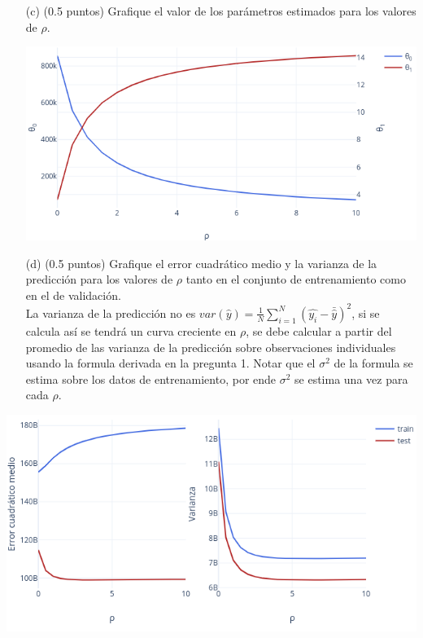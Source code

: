 \documentclass[11pt,letterpaper]{article}
\begin{document}
\begin{itemize}
\begin{itemize}
	\item[(c)] (0.5 puntos) Grafique el valor de los parámetros estimados para los valores de $\rho$.\\
	
    \begin{minipage}{\linewidth}
        \centering
        \includegraphics[width=1\textwidth]{img/params.png}
    \end{minipage}	
	\item[(d)] (0.5 puntos) Grafique el error cuadrático medio y la varianza de la predicción para los valores de $\rho$ tanto en el conjunto de entrenamiento como en el de validación.\\
	
	La varianza de la predicción no es $var(\hat{y}) = \frac{1}{N}\sum_{i=1}^{N}(\hat{y_{i}}-\bar{\hat{y}})^{2}$, si se calcula así se tendrá un curva creciente en $\rho$, se debe calcular a partir del promedio de las varianza de la predicción sobre observaciones individuales usando la formula derivada en la pregunta 1. Notar que el $\sigma^{2}$ de la formula se estima sobre los datos de entrenamiento,  por ende $\sigma^{2}$ se estima una vez para cada $\rho$.
	\end{itemize}

	\begin{minipage}{\linewidth}
    \centering
    \includegraphics[width=\textwidth]{img/mse_var.png}
    \end{minipage}	
	

\end{itemize}
\end{document}
